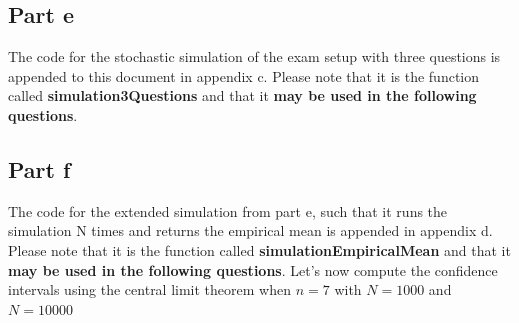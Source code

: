 \documentclass{article}
\begin{document}
\subsection*{Part e}
The code for the stochastic simulation of the exam setup with three questions is
appended to this document in appendix c.
Please note that it is the function called \textbf{simulation3Questions} and that it
\textbf{may be used in the following questions}.


\subsection*{Part f}
The code for the extended simulation from part e, such that it runs the simulation
N times and returns the empirical mean is appended in appendix d.
Please note that it is the function called \textbf{simulationEmpiricalMean} and that it
\textbf{may be used in the following questions}.
Let's now compute the confidence intervals using the central limit theorem when
$ n = 7 $ with $ N = 1000 $ and $ N = 10000 $
\end{document}
